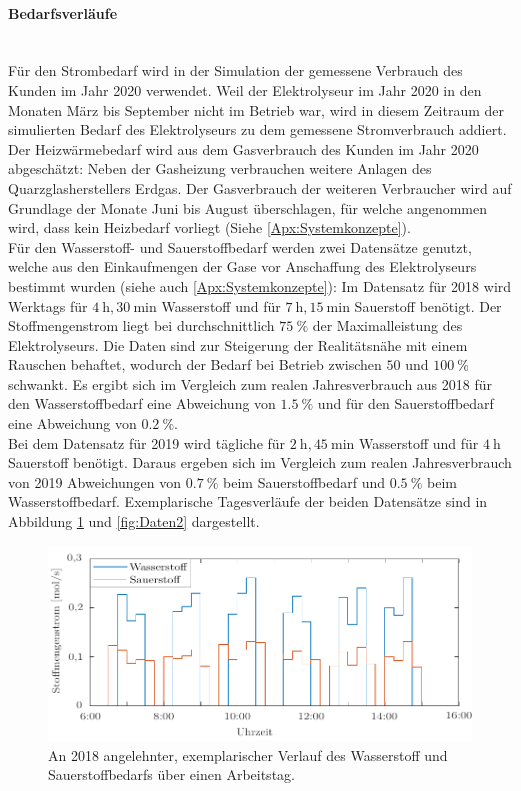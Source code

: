 \paragraph{Bedarfsverläufe}\ \\
Für den Strombedarf wird in der Simulation der gemessene Verbrauch des Kunden im Jahr 2020 verwendet. Weil der Elektrolyseur im Jahr 2020 in den Monaten März bis September nicht im Betrieb war, wird in diesem Zeitraum der simulierten Bedarf des Elektrolyseurs zu dem gemessene Stromverbrauch addiert.\\
Der Heizwärmebedarf wird aus dem Gasverbrauch des Kunden im Jahr 2020 abgeschätzt: Neben der Gasheizung verbrauchen weitere Anlagen des Quarzglasherstellers Erdgas. Der Gasverbrauch der weiteren Verbraucher wird auf Grundlage der Monate Juni bis August überschlagen, für welche angenommen wird, dass kein Heizbedarf vorliegt (Siehe \ref{Apx:Systemkonzepte}).\\

Für den Wasserstoff- und Sauerstoffbedarf werden zwei Datensätze genutzt, welche aus den Einkaufmengen der Gase vor Anschaffung des Elektrolyseurs bestimmt wurden (siehe auch \ref{Apx:Systemkonzepte}): Im Datensatz für 2018 wird Werktags für $\SI{4}{\hour},\SI{30}{\minute}$ Wasserstoff und für $\SI{7}{\hour},\SI{15}{\minute}$ Sauerstoff benötigt. Der Stoffmengenstrom liegt bei durchschnittlich $\SI{75}{\%}$ der Maximalleistung des Elektrolyseurs. Die Daten sind zur Steigerung der Realitätsnähe mit einem Rauschen behaftet, wodurch der Bedarf bei Betrieb zwischen $50$ und $\SI{100}{\%}$ schwankt. Es ergibt sich im Vergleich zum realen Jahresverbrauch aus 2018 für den Wasserstoffbedarf eine Abweichung von $\SI{1,5}{\%}$ und für den Sauerstoffbedarf eine Abweichung von $\SI{0,2}{\%}$.\\
Bei dem Datensatz für 2019 wird tägliche für $\SI{2}{\hour},\SI{45}{\minute}$ Wasserstoff und für $\SI{4}{\hour}$ Sauerstoff benötigt. Daraus ergeben sich im Vergleich zum realen Jahresverbrauch von 2019 Abweichungen von $\SI{0,7}{\%}$ beim Sauerstoffbedarf und $\SI{0,5}{\%}$ beim Wasserstoffbedarf. Exemplarische Tagesverläufe der beiden Datensätze sind in Abbildung \ref{fig:Daten1} und \ref{fig:Daten2} dargestellt.\\

\begin{figure}[h]
	\centering
		\includegraphics[scale=1]{Figures/Datensatz1molar}
		\caption{An 2018 angelehnter, exemplarischer Verlauf des Wasserstoff und Sauerstoffbedarfs über einen Arbeitstag.}	
\label{fig:Daten1}	
\end{figure}

